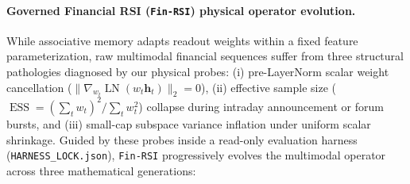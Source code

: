 \paragraph{Governed Financial RSI (\texttt{Fin-RSI}) physical operator evolution.}
While associative memory adapts readout weights within a fixed feature parameterization,
raw multimodal financial sequences suffer from three structural pathologies diagnosed by our
physical probes: (i) pre-LayerNorm scalar weight cancellation
($\|\nabla_{w_t}\operatorname{LN}(w_t \mathbf{h}_t)\|_2 = 0$),
(ii) effective sample size ($\operatorname{ESS} = (\sum_t w_t)^2 / \sum_t w_t^2$) collapse during
intraday announcement or forum bursts, and (iii) small-cap subspace variance inflation under
uniform scalar shrinkage. Guided by these probes inside a read-only evaluation harness
(\texttt{HARNESS\_LOCK.json}), \texttt{Fin-RSI} progressively evolves the multimodal operator across
three mathematical generations:
